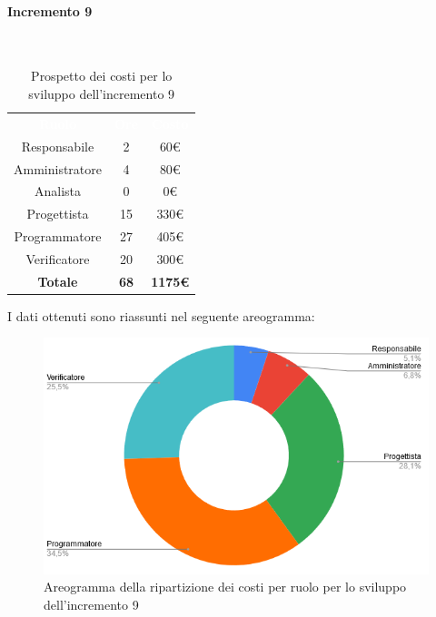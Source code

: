\paragraph*{Incremento 9}\mbox{} \\
\begin{table}[H]
\centering\renewcommand{\arraystretch}{1.5}
\caption{Prospetto dei costi per lo sviluppo dell'incremento 9}
\vspace{0.2cm}
\begin{tabular}{ c c c }
\rowcolor{redafk}
\textcolor{white}{\textbf{Ruolo}} & \textcolor{white}{\textbf{Ore}} &
\textcolor{white}{\textbf{Costo}}  \\
Responsabile & 2 & 60€ \\
Amministratore & 4 & 80€ \\
Analista & 0 & 0€ \\
Progettista & 15 & 330€ \\
Programmatore & 27 & 405€  \\
Verificatore & 20 & 300€  \\
\rowcolor{lastrowcolor}
\textbf{Totale} & \textbf{68} & \textbf{1175€}  \\
\end{tabular}
\end{table}
 
I dati ottenuti sono riassunti nel seguente areogramma:
\begin{figure}[H]
\centering
\includegraphics[scale=0.60]{img/grafici/torta_inc9.png}
\caption{Areogramma della ripartizione dei costi per ruolo per lo sviluppo dell'incremento 9}
\end{figure}

